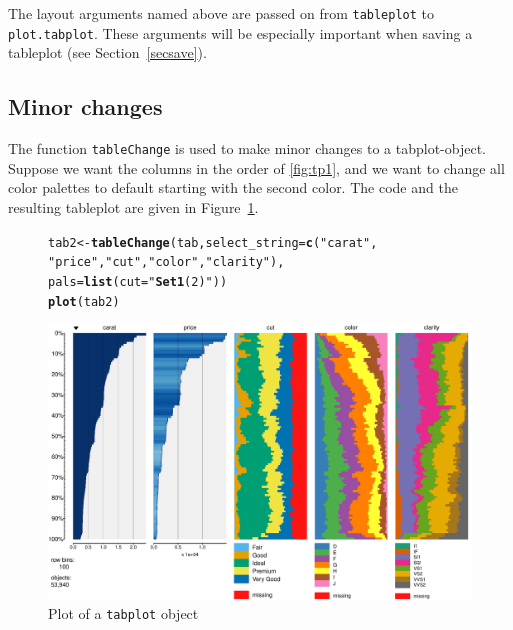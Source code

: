 \documentclass[11pt, fleqn, a4paper]{article}\usepackage{graphicx, color}
\makeatletter
\def\maxwidth{ %
  \ifdim\Gin@nat@width>\linewidth
    \linewidth
  \else
    \Gin@nat@width
  \fi
}
\newcommand{\hlfunctioncall}[1]{\textcolor[rgb]{0.501960784313725,0,0.329411764705882}{\textbf{#1}}}%
\newcommand{\hlstring}[1]{\textcolor[rgb]{0.6,0.6,1}{#1}}%
\newenvironment{kframe}{%
 \def\at@end@of@kframe{}%
 \ifinner\ifhmode%
  \def\at@end@of@kframe{\end{minipage}}%
  \begin{minipage}{\columnwidth}%
 \fi\fi%
 \def\FrameCommand##1{\hskip\@totalleftmargin \hskip-\fboxsep
 \colorbox{shadecolor}{##1}\hskip-\fboxsep
     \hskip-\linewidth \hskip-\@totalleftmargin \hskip\columnwidth}%
 \MakeFramed {\advance\hsize-\width
   \@totalleftmargin\z@ \linewidth\hsize
   \@setminipage}}%
 {\par\unskip\endMakeFramed%
 \at@end@of@kframe}
\newenvironment{knitrout}{}{} %
\makeatother
\begin{document}
The layout arguments named above are passed on from {\tt tableplot} to {\tt plot.tabplot}. These arguments will be especially important when saving a tableplot (see Section~\ref{secsave}).



\subsection{Minor changes}

The function {\tt tableChange} is used to make minor changes to a tabplot-object. Suppose we want the columns in the order of \ref{fig:tp1}, and we want to change all color palettes to default starting with the second color. The code and the resulting tableplot are given in Figure~\ref{fig:tp7}.

\begin{figure}[htp]
\begin{knitrout}
\color{fgcolor}\begin{kframe}
\begin{alltt}
tab2 <- \hlfunctioncall{tableChange}(tab, select_string = \hlfunctioncall{c}(\hlstring{"carat"}, 
    \hlstring{"price"}, \hlstring{"cut"}, \hlstring{"color"}, \hlstring{"clarity"}), 
    pals = \hlfunctioncall{list}(cut = \hlstring{"\hlfunctioncall{Set1}(2)"}))
\hlfunctioncall{plot}(tab2)
\end{alltt}
\end{kframe}
\includegraphics[width=\maxwidth]{figure/chunk13} 

\end{knitrout}

\caption{Plot of a {\tt tabplot} object}
\label{fig:tp7}
\end{figure}
\end{document}
